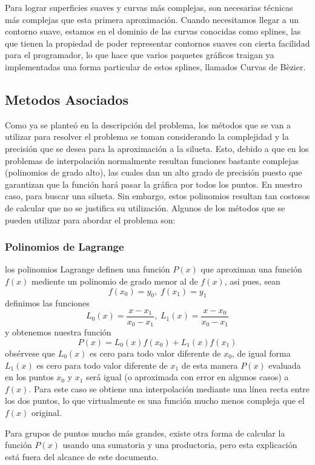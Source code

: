 \documentclass[final, 12pt letterpaper]{article}
\begin{document}
Para lograr superficies suaves y curvas más complejas, son necesarias técnicas más complejas que esta primera aproximación. Cuando necesitamos llegar a un contorno suave, estamos en el dominio de las curvas conocidas como splines, las que tienen la propiedad de poder representar contornos suaves con cierta facilidad para el programador, lo que hace que varios paquetes gráficos traigan ya implementadas una forma particular de estos splines, llamados Curvas de Bèzier.
\subsection{Metodos Asociados}
Como ya se planteó en la descripción del problema, los métodos que se van a utilizar para resolver el problema se toman considerando la complejidad y la precisión que se desea para la aproximación a la silueta. Esto, debido a que  en los problemas de interpolación normalmente resultan funciones bastante complejas (polinomios de grado alto), las cuales dan un alto grado de precisión puesto que garantizan que la función hará pasar la gráfica por todos los puntos. En nuestro caso, para buscar una silueta. Sin embargo, estos polinomios resultan tan costosos de calcular que no se justifica su utilización.
Algunos de los métodos que se pueden utilizar para abordar el problema son:

\subsubsection{Polinomios de Lagrange \cite{AN-NUMERICO}}  

los polinomios Lagrange definen una función  $P(x)$ que aproximan una función $f(x)$ mediente un polinomio de grado menor al de $f(x)$, asi pues, sean 
\[
f(x_0) = y_0, \; f(x_1) = y_1
\]
definimos las funciones
\[
L_0(x) = \frac{x-x_1}{x_0-x_1}, \; L_1(x) = \frac{x-x_0}{x_0-x_1}
\]
y obtenemos nuestra función 
\[
P(x) = L_0(x)f(x_0) + L_1(x)f(x_1)
\]
obsérvese que $L_0(x)$ es cero para todo valor diferente de $x_0$, de igual forma $L_1(x)$ es cero para todo valor diferente de $x_1$
de esta manera $P(x)$ evaluada en los puntos $x_0$ y $x_1$ será igual (o aproximada con error en algunos casos) a $f(x)$. Para este caso se obtiene una interpolación mediante una línea recta entre los dos puntos, lo que virtualmente es una función mucho menos compleja que el $f(x)$ original.

Para grupos de puntos mucho más grandes, existe otra forma de calcular la función $P(x)$ usando una sumatoria y una productoria, pero esta explicación está fuera del alcance de este documento.
\end{document}
